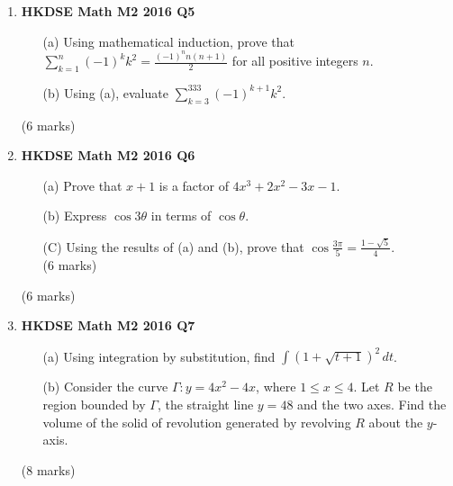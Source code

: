 \documentclass[12pt]{article}
\begin{document}
\begin{enumerate}
	\item \textbf{HKDSE Math M2 2016 Q5}
	\begin{enumerate}
		\item [(a)]Using mathematical induction, prove that $\displaystyle\sum_{k=1}^{n} (-1)^k k^2 = \frac{(-1)^n n(n+1)}{2}$ for all positive integers $n$. 
		\item [(b)]Using (a), evaluate $\displaystyle\sum_{k=3}^{333} (-1)^{k+1} k^2$.
	\end{enumerate}
	(6 marks)

	\item \textbf{HKDSE Math M2 2016 Q6}
	\begin{enumerate}
		\item [(a)]Prove that $x+1$ is a factor of $4x^3+2x^2-3x-1$. 
		\item [(b)]Express $\cos{3\theta}$ in terms of $\cos{\theta}$.
		\item [(C)]Using the results of (a) and (b), prove that $\cos{\displaystyle\frac{3\pi}{5}} = \displaystyle\frac{1-\sqrt{5}}{4}$. \\(6 marks)
	\end{enumerate}
	(6 marks)

	\item \textbf{HKDSE Math M2 2016 Q7}
	\begin{enumerate}
		\item [(a)]Using integration by substitution, find $\displaystyle\int (1+\sqrt{t+1})^2 \,dt$. 
		\item [(b)]Consider the curve $\Gamma : y = 4x^2 - 4x$, where $1 \leq x \leq 4$. Let $R$ be the region bounded by $\Gamma$, the straight line $y=48$ and the two axes. Find the volume of the solid of revolution generated by revolving $R$ about the $y$-axis.
	\end{enumerate}
	(8 marks)


\end{enumerate}
\end{document}
